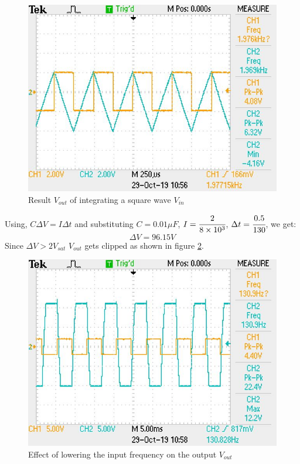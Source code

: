 \documentclass[12pt, titlepage]{article}
\theoremstyle{definition}
\begin{document}
    \begin{figure}[!h]
      \centering
      \includegraphics[scale=0.5]{images/results_q3.jpeg}
      \caption{Result \color{cyan}$V_{out}$ \color{black}of integrating a square wave \color{orange}$V_{in}$}
      \label{fig:results_q3}
    \end{figure}

    Using, $ C\Delta V = I\Delta t$ and substituting $C=0.01\mu F$, $I=\cfrac{2}{8\times 10^3}$, $\Delta t = \cfrac{0.5}{130}$, we get:
    $$ \Delta V = 96.15 V$$
    Since $\Delta V > 2V_{sat}$ \text{, } $V_{out}$ gets clipped as shown in figure \ref{fig:results_q4}.

    \begin{figure}[!h]
      \centering
      \includegraphics[scale=0.5]{images/results_q4_2.jpeg}
      \caption{Effect of lowering the input frequency on the output \color{cyan}$V_{out}$}
      \label{fig:results_q4}
    \end{figure}
\end{document}
